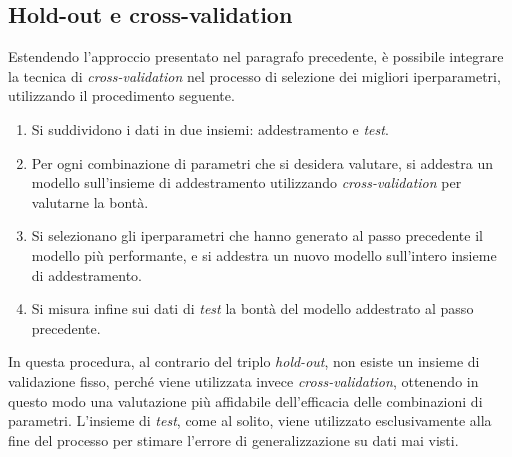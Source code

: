 \subsection{Hold-out e cross-validation}
Estendendo l'approccio presentato nel paragrafo precedente, è possibile integrare la tecnica di \emph{cross-validation} nel processo di selezione dei migliori iperparametri, utilizzando il procedimento seguente.
\begin{enumerate}
    \item Si suddividono i dati in due insiemi: addestramento e \emph{test}.
    \item Per ogni combinazione di parametri che si desidera valutare, si addestra un modello sull'insieme di addestramento utilizzando \emph{cross-validation} per valutarne la bontà.
    \item Si selezionano gli iperparametri che hanno generato al passo precedente il modello più performante, e si addestra un nuovo modello sull'intero insieme di addestramento.
    \item Si misura infine sui dati di \emph{test} la bontà del modello addestrato al passo precedente.
\end{enumerate}
In questa procedura, al contrario del triplo \emph{hold-out}, non esiste un insieme di validazione fisso, perché viene utilizzata invece \emph{cross-validation}, ottenendo in questo modo una valutazione più affidabile dell'efficacia delle combinazioni di parametri.
L'insieme di \emph{test}, come al solito, viene utilizzato esclusivamente alla fine del processo per stimare l'errore di generalizzazione su dati mai visti.

